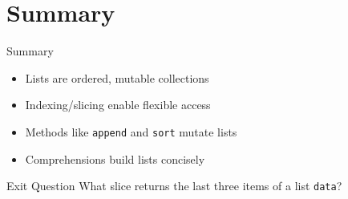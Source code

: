 \documentclass{beamer}
\begin{document}
\section{Summary}
\label{sec:summary}

\begin{frame}[fragile]{Summary}
  \begin{itemize}[<+->]
    \item Lists are ordered, mutable collections
    \item Indexing/slicing enable flexible access
    \item Methods like \texttt{append} and \texttt{sort} mutate lists
    \item Comprehensions build lists concisely
  \end{itemize}
\end{frame}

\begin{frame}[fragile]{Exit Question}
  What slice returns the last three items of a list \texttt{data}?
\end{frame}
\end{document}
